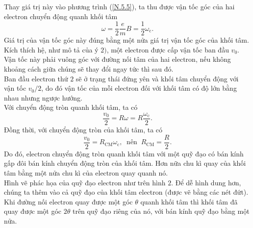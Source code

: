 \begin{loigiai}
\begin{enumerate}[1)]
     Thay giá trị này vào phương trình (\ref{N.5.5}), ta thu được vận tốc góc của hai electron chuyển động quanh khối tâm
    \[\omega = \dfrac{1}{2} \dfrac{e}{m} B=\dfrac{1}{2} \omega_{\mathrm{c}}.\]
    Giá trị của vận tốc góc này đúng bằng một nửa giá trị vận tốc góc của khối tâm.\\
   Kích thích hệ, như mô tả của ý $2)$, một electron được cấp vận tốc ban đầu $v_0$. Vận tốc này phải vuông góc với đường nối tâm của hai electron, nếu không khoảng cách giữa chúng sẽ thay đổi ngay tức thì sau đó.\\
   Ban đầu electron thứ $2$ sẽ ở trạng thái đứng yên và khối tâm chuyển động với vận tốc $v_0/2$, do đó vận tốc của mỗi electron đối với khối tâm có độ lớn bằng nhau nhưng ngược hướng.\\
   Với chuyển động tròn quanh khối tâm, ta có 
    \[\dfrac{v_0}{2} = R\omega = R \dfrac{\omega_{\mathrm{c}}}{2}.\]
    Đồng thời, với chuyển động tròn của khối tâm, ta có
    \[\dfrac{v_{0}}{2} = R_{\mathrm{CM}} \omega_{\mathrm{c}}, \ \text{ nên }  \ R_{\mathrm{CM}}=\dfrac{R}{2}.\]
     Do đó, electron chuyển động tròn quanh khối tâm với một quỹ đạo có bán kính gấp đôi bán kính chuyển động tròn của khối tâm. Hơn nữa chu kì quay của khối tâm bằng một nửa chu kì của electron quay quanh nó.\\
     Hình vẽ phác họa của quỹ đạo electron như trên hình $2$. Để dễ hình dung hơn, chúng ta thêm vào cả quỹ đạo của khối tâm electron (được vẽ bằng các nét đứt). Khi đường nối electron quay được một góc $\theta$ quanh khối tâm thì khối tâm đã quay được một góc $2 \theta$ trên quỹ đạo riêng của nó, với bán kính quỹ đạo bằng một nửa.


\end{enumerate}
\end{loigiai}

